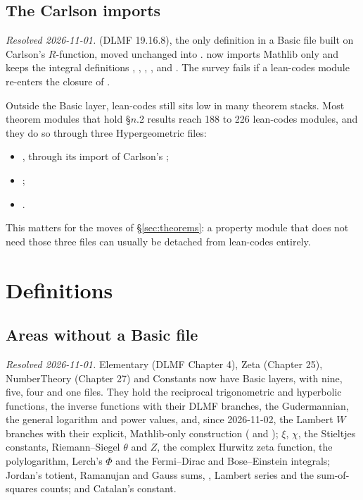 \documentclass[11pt,a4paper]{article}
\newcommand{\resolved}[1]{\textit{Resolved #1.}}
\begin{document}
\subsection{The Carlson imports}

\resolved{2026-11-01}  (DLMF 19.16.8), the only definition in a Basic file
built on Carlson's \(R\)-function, moved unchanged into
.  now
imports Mathlib only and keeps the integral definitions , ,
, ,  and . The survey
fails if a lean-codes module re-enters the closure of .

Outside the Basic layer, lean-codes still sits low in many theorem stacks. Most theorem modules
that hold \S\(n\).2 results reach 188 to 226 lean-codes modules, and they do so through three
Hypergeometric files:
\begin{itemize}
  \item {}, through its import of Carlson's
    ;
  \item {};
  \item {}.
\end{itemize}
This matters for the moves of
\S\ref{sec:theorems}: a property module that does not need those three files can usually be
detached from lean-codes entirely.

\section{Definitions}\label{sec:definitions}

\subsection{Areas without a Basic file}

\resolved{2026-11-01} Elementary (DLMF Chapter 4), Zeta (Chapter 25), NumberTheory (Chapter 27)
and Constants now have Basic layers, with nine, five, four and one files. They hold the
reciprocal trigonometric and hyperbolic functions, the inverse functions with their DLMF
branches, the Gudermannian, the general logarithm and power values, and, since 2026-11-02, the
Lambert \(W\) branches with their explicit, Mathlib-only construction
( and );
\(\xi\), \(\chi\), the Stieltjes constants, Riemann--Siegel \(\theta\) and \(Z\), the complex
Hurwitz zeta function, the polylogarithm, Lerch's \(\Phi\) and the Fermi--Dirac and
Bose--Einstein integrals; Jordan's totient, Ramanujan and Gauss sums, ,
Lambert series and the sum-of-squares counts; and Catalan's constant.
\end{document}

